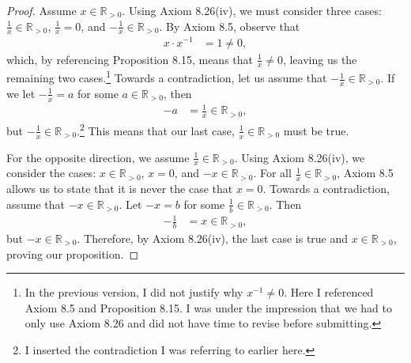\documentclass[12pt]{amsart}
\newcommand{\R}{\mathbb{R}}
\begin{document}
\begin{proof}
Assume $x\in\R_{>0}$.  Using Axiom 8.26(iv), we must consider three cases: $\frac{1}{x}\in\R_{>0}$, $\frac{1}{x}=0$, and $-\frac{1}{x}\in\R_{>0}$.  By Axiom 8.5, observe that
\begin{align*}
x\cdot x^{-1} &= 1 \neq 0,
\end{align*}
which, by referencing Proposition 8.15, means that $\frac{1}{x} \neq 0$, leaving us the remaining two cases.\footnote{In the previous version, I did not justify why $x^{-1} \neq 0$.  Here I referenced Axiom 8.5 and Proposition 8.15.  I was under the impression that we had to only use Axiom 8.26 and did not have time to revise before submitting.}  Towards a contradiction, let us assume that $-\frac{1}{x}\in\R_{>0}$.  If we let $-\frac{1}{x} = a$ for some $a\in\R_{>0}$, then
\begin{align*}
-a &= \frac{1}{x}\in\R_{>0},
\end{align*}
but $-\frac{1}{x}\in\R_{>0}$.\footnote{I inserted the contradiction I was referring to earlier here.}  This means that our last case, $\frac{1}{x}\in\R_{>0}$ must be true.

For the opposite direction, we assume $\frac{1}{x}\in\R_{>0}$.  Using Axiom 8.26(iv), we consider the cases: $x\in\R_{>0}$, $x=0$, and $-x\in\R_{>0}$.  For all $\frac{1}{x}\in\R_{>0}$, Axiom 8.5 allows us to state that it is never the case that $x=0$.  Towards a contradiction, assume that $-x\in\R_{>0}$.  Let $-x = b$ for some $\frac{1}{b}\in\R_{>0}$.  Then
\begin{align*}
-\frac{1}{b} &= x\in\R_{>0},
\end{align*}
but $-x\in\R_{>0}$.  Therefore, by Axiom 8.26(iv), the last case is true and $x\in\R_{>0}$, proving our proposition.
\end{proof}
\end{document}
